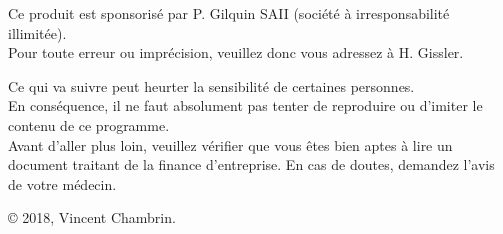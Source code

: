 


\cleardoublepage

\thispagestyle{empty}

\vspace*{\fill}


\begin{center}
Ce produit est sponsorisé par P.\/ Gilquin SAII (société à irresponsabilité illimitée). \\
Pour toute erreur ou imprécision, veuillez donc vous adressez à H.\/ Gissler.
\end{center}


\vspace*{\fill}

\noindent
Ce qui va suivre peut heurter la sensibilité de certaines personnes. 
\\
En conséquence, il ne faut absolument pas tenter de reproduire ou d'imiter le contenu  
de ce programme. \\
Avant d'aller plus loin, veuillez vérifier que vous êtes bien aptes à lire 
un document traitant de la finance d'entreprise. 
En cas de doutes, demandez l'avis de votre médecin.

\vspace{2em}

\begin{center}
© 2018, Vincent Chambrin. 
\end{center}

\newpage



\newpage
\let\oldleftmark=\leftmark
\renewcommand{\leftmark}{Table des matières}

\setcounter{tocdepth}{4}

\pagebreak
\let\leftmark=\oldleftmark